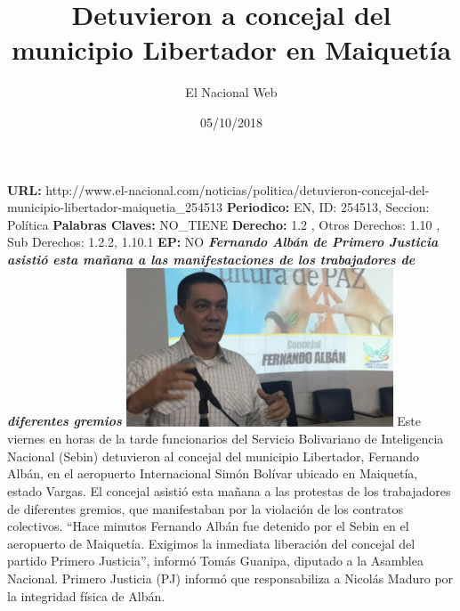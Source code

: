 \documentclass{article}%
\title{\textbf{Detuvieron a concejal del municipio Libertador en Maiquetía}}%
\author{El Nacional Web}%
\date{05/10/2018}%
\begin{document}
%
\normalsize%
\maketitle%
\textbf{URL: }%
http://www.el{-}nacional.com/noticias/politica/detuvieron{-}concejal{-}del{-}municipio{-}libertador{-}maiquetia\_254513\newline%
%
\textbf{Periodico: }%
EN, %
ID: %
254513, %
Seccion: %
Política\newline%
%
\textbf{Palabras Claves: }%
NO\_TIENE\newline%
%
\textbf{Derecho: }%
1.2%
, Otros Derechos: %
1.10%
, Sub Derechos: %
1.2.2, 1.10.1%
\newline%
%
\textbf{EP: }%
NO\newline%
\newline%
%
\textbf{\textit{Fernando Albán de Primero Justicia asistió esta mañana a las manifestaciones de los trabajadores de diferentes gremios}}%
\newline%
\newline%
%
\includegraphics[width=300px]{152.jpg}%
\newline%
%
Este viernes en horas de la tarde funcionarios del Servicio Bolivariano de Inteligencia Nacional (Sebin) detuvieron al concejal del municipio Libertador, Fernando Albán, en el aeropuerto Internacional Simón Bolívar ubicado en Maiquetía, estado Vargas.%
\newline%
%
El concejal asistió esta mañana a las protestas de los trabajadores de diferentes gremios, que manifestaban por la violación de los contratos colectivos.%
\newline%
%
“Hace minutos Fernando Albán fue detenido por el Sebin en el aeropuerto de Maiquetía. Exigimos la inmediata liberación del concejal del partido Primero Justicia”, informó Tomás Guanipa, diputado a la Asamblea Nacional.%
\newline%
%
Primero Justicia (PJ) informó que responsabiliza a Nicolás Maduro por la integridad física de Albán.%
\newline%
%
\end{document}
